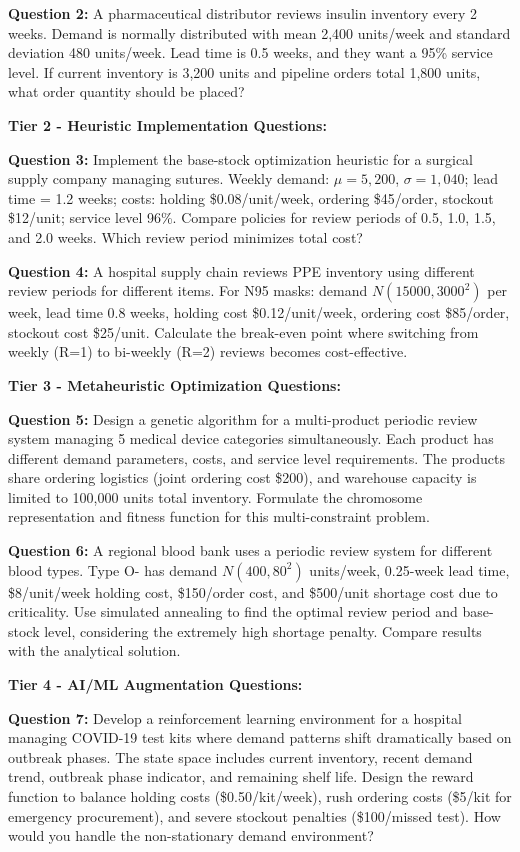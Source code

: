 \documentclass{article}
\begin{document}
\textbf{Question 2:} A pharmaceutical distributor reviews insulin inventory every 2 weeks. Demand is normally distributed with mean 2,400 units/week and standard deviation 480 units/week. Lead time is 0.5 weeks, and they want a 95\% service level. If current inventory is 3,200 units and pipeline orders total 1,800 units, what order quantity should be placed?

\textbf{Tier 2 - Heuristic Implementation Questions:}

\textbf{Question 3:} Implement the base-stock optimization heuristic for a surgical supply company managing sutures. Weekly demand: $\mu = 5,200$, $\sigma = 1,040$; lead time = 1.2 weeks; costs: holding \$0.08/unit/week, ordering \$45/order, stockout \$12/unit; service level 96\%. Compare policies for review periods of 0.5, 1.0, 1.5, and 2.0 weeks. Which review period minimizes total cost?

\textbf{Question 4:} A hospital supply chain reviews PPE inventory using different review periods for different items. For N95 masks: demand $N(15000, 3000^2)$ per week, lead time 0.8 weeks, holding cost \$0.12/unit/week, ordering cost \$85/order, stockout cost \$25/unit. Calculate the break-even point where switching from weekly (R=1) to bi-weekly (R=2) reviews becomes cost-effective.

\textbf{Tier 3 - Metaheuristic Optimization Questions:}

\textbf{Question 5:} Design a genetic algorithm for a multi-product periodic review system managing 5 medical device categories simultaneously. Each product has different demand parameters, costs, and service level requirements. The products share ordering logistics (joint ordering cost \$200), and warehouse capacity is limited to 100,000 units total inventory. Formulate the chromosome representation and fitness function for this multi-constraint problem.

\textbf{Question 6:} A regional blood bank uses a periodic review system for different blood types. Type O- has demand $N(400, 80^2)$ units/week, 0.25-week lead time, \$8/unit/week holding cost, \$150/order cost, and \$500/unit shortage cost due to criticality. Use simulated annealing to find the optimal review period and base-stock level, considering the extremely high shortage penalty. Compare results with the analytical solution.

\textbf{Tier 4 - AI/ML Augmentation Questions:}

\textbf{Question 7:} Develop a reinforcement learning environment for a hospital managing COVID-19 test kits where demand patterns shift dramatically based on outbreak phases. The state space includes current inventory, recent demand trend, outbreak phase indicator, and remaining shelf life. Design the reward function to balance holding costs (\$0.50/kit/week), rush ordering costs (\$5/kit for emergency procurement), and severe stockout penalties (\$100/missed test). How would you handle the non-stationary demand environment?
\end{document}
